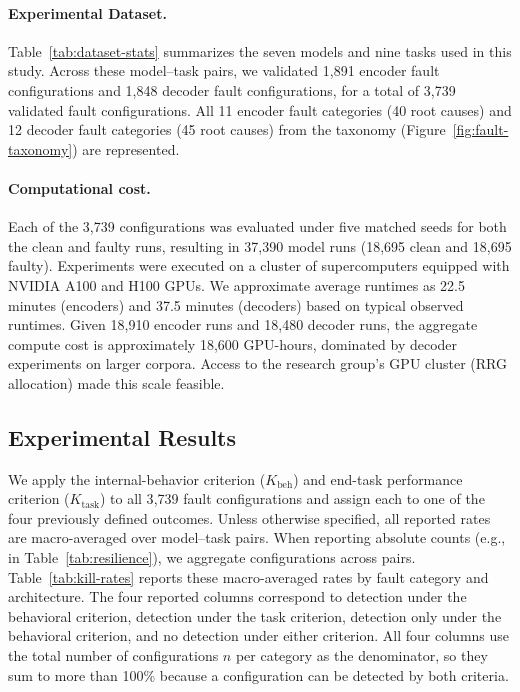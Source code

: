\paragraph{Experimental Dataset.}
Table~\ref{tab:dataset-stats} summarizes the seven models and nine tasks used in this study. Across these model--task pairs, we validated 1{,}891 encoder fault configurations and 1{,}848 decoder fault configurations, for a total of 3{,}739 validated fault configurations. All 11 encoder fault categories (40 root causes) and 12 decoder fault categories (45 root causes) from the taxonomy (Figure~\ref{fig:fault-taxonomy}) are represented.

\paragraph{Computational cost.}
Each of the 3{,}739 configurations was evaluated under five matched seeds for both the clean and faulty runs, resulting in 37{,}390 model runs (18{,}695 clean and 18{,}695 faulty). Experiments were executed on a cluster of supercomputers equipped with NVIDIA A100 and H100 GPUs. We approximate average runtimes as 22.5 minutes (encoders) and 37.5 minutes (decoders) based on typical observed runtimes. Given 18{,}910 encoder runs and 18{,}480 decoder runs, the aggregate compute cost is approximately 18{,}600 GPU-hours, dominated by decoder experiments on larger corpora. Access to the research group's GPU cluster (RRG allocation) made this scale feasible.
\subsection{Experimental Results}
\label{sec:criteria-results}

We apply the internal-behavior criterion ($K_{\text{beh}}$) and end-task performance criterion ($K_{\text{task}}$) to all 3{,}739 fault configurations and assign each to one of the four previously defined outcomes. Unless otherwise specified, all reported rates are macro-averaged over model--task pairs. When reporting absolute counts (e.g., in Table~\ref{tab:resilience}), we aggregate configurations across pairs. Table~\ref{tab:kill-rates} reports these macro-averaged rates by fault category and architecture. The four reported columns correspond to detection under the behavioral criterion, detection under the task criterion, detection only under the behavioral criterion, and no detection under either criterion. All four columns use the total number of configurations $n$ per category as the denominator, so they sum to more than 100\% because a configuration can be detected by both criteria.

